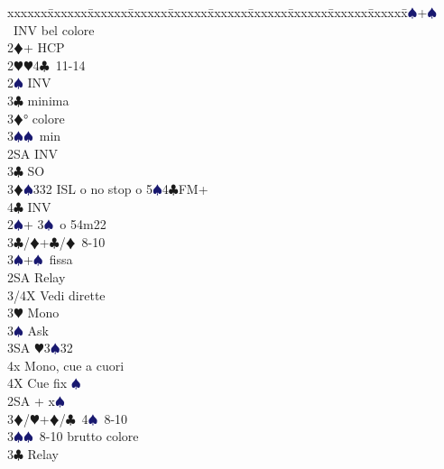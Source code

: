 \documentclass[a4paper,italian]{article}
\newcommand{\BC}{\textcolor{OliveGreen}{$\clubsuit$}}
\newcommand{\BD}{\textcolor{RedOrange}{$\vardiamondsuit$}}
\newcommand{\BH}{\textcolor{Red2}{$\varheartsuit${}}}
\newcommand{\BS}{\textcolor{MidnightBlue}{$\spadesuit${}}}
\newenvironment{bidtable}
{\begin{tabbing}

    xxxxxx\=xxxxxx\=xxxxxx\=xxxxxx\=xxxxxx\=xxxxxx\=xxxxxx\=xxxxxx\=xxxxxx\=xxxxxx\=\kill}
{\end{tabbing} }%
\begin{document}
\begin{multicols*}{2}
\begin{bidtable}
                                            3\BS {}+\BS\ INV bel colore\\
                                            2\BD {}+ HCP\+\\
                                            2\BH {}\BH 4\BC\ 11-14\+\\
                                            2\BS \> INV\+\\
                                            3\BC {} minima\\
                                            3\BD {}° colore\\
                                            3\BS {}\BS\ min\-\\
                                            2SA \> INV\\
                                            3\BC \> SO\\
                                            3\BD {}\BS 332 ISL o no stop o 5\BS 4\BC FM+\\
                                            4\BC \> INV\-\\
                                            2\BS {}+ 3\BS\ o 54m22\+\\
                                            3\BC/\BD {}+\BC /\BD\ 8-10\\
                                            3\BS {}+\BS\ fissa\\
                                            2SA \> Relay\+\\
                                            3/4X \> Vedi dirette\\
                                            3\BH \> Mono\+\\
                                            3\BS \> Ask\+\\
                                            3SA \BH 3\BS 32\\
                                            4x \> Mono, cue a cuori\-\\
                                            4X \> Cue fix \BS \-\-\-\\
                                            2SA + x\BS \+\\
                                            3\BD/\BH {}+\BD /\BC\ 4\BS\ 8-10\\
                                            3\BS {}\BS\ 8-10 brutto colore\\
                                            3\BC \> Relay\+\\

\end{bidtable}
\end{multicols*}
\end{document}

